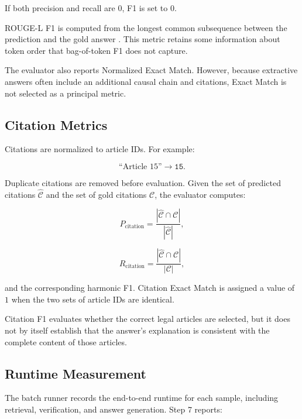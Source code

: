 If both precision and recall are \(0\), F1 is set to \(0\).

ROUGE-L F1 is computed from the longest common subsequence between the
prediction and the gold answer \cite{lin2004rouge}. This metric retains some
information about token order that bag-of-token F1 does not capture.

The evaluator also reports Normalized Exact Match. However, because extractive
answers often include an additional causal chain and citations, Exact Match is
not selected as a principal metric.

\subsection{Citation Metrics}

Citations are normalized to article IDs. For example:

\[
\text{``Article 15''}
\longrightarrow
\texttt{15}.
\]

Duplicate citations are removed before evaluation. Given the set of predicted
citations \(\widehat{\mathcal{C}}\) and the set of gold citations
\(\mathcal{C}\), the evaluator computes:

\begin{equation}
P_{\mathrm{citation}}
=
\frac{
    |
    \widehat{\mathcal{C}}
    \cap
    \mathcal{C}
    |
}{
    |
    \widehat{\mathcal{C}}
    |
},
\end{equation}

\begin{equation}
R_{\mathrm{citation}}
=
\frac{
    |
    \widehat{\mathcal{C}}
    \cap
    \mathcal{C}
    |
}{
    |
    \mathcal{C}
    |
},
\end{equation}

and the corresponding harmonic F1. Citation Exact Match is assigned a value
of \(1\) when the two sets of article IDs are identical.

Citation F1 evaluates whether the correct legal articles are selected, but it
does not by itself establish that the answer's explanation is consistent with
the complete content of those articles.

\subsection{Runtime Measurement}

The batch runner records the end-to-end runtime for each sample, including
retrieval, verification, and answer generation. Step 7 reports:


